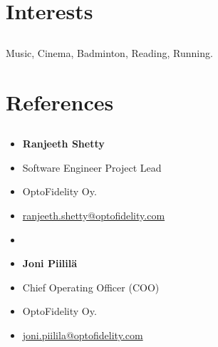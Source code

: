 \documentclass{article}
\begin{document}
\section{Interests}
\subsection{}
Music, Cinema, Badminton, Reading, Running.
\subsection{}


\section{References}
\subsection{}
\begin{itemize}[label={}]
\itemsep0em 
  \item \textbf{Ranjeeth Shetty}
  \item Software Engineer Project Lead
  \item OptoFidelity Oy.
  \item \href{mailto:me@example.com}{ranjeeth.shetty@optofidelity.com}

  \item 

  \item \textbf{Joni Piililä}
  \item Chief Operating Officer (COO)
  \item OptoFidelity Oy.
  \item \href{mailto:me@example.com}{joni.piilila@optofidelity.com}
\end{itemize}

\subsection{}
\end{document}
